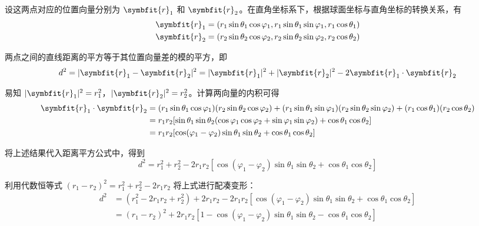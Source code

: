 \begin{myproof}
    设这两点对应的位置向量分别为 $\symbfit{r}_1$ 和 $\symbfit{r}_2$。在直角坐标系下，根据球面坐标与直角坐标的转换关系，有
    \begin{equation}
        \begin{aligned}
            \symbfit{r}_1 & = (r_1 \sin\theta_1 \cos\varphi_1, r_1 \sin\theta_1 \sin\varphi_1, r_1 \cos\theta_1) \\
            \symbfit{r}_2 & = (r_2 \sin\theta_2 \cos\varphi_2, r_2 \sin\theta_2 \sin\varphi_2, r_2 \cos\theta_2)
        \end{aligned}
    \end{equation}

    两点之间的直线距离的平方等于其位置向量差的模的平方，即
    \begin{equation}
        d^2 = |\symbfit{r}_1 - \symbfit{r}_2|^2 = |\symbfit{r}_1|^2 + |\symbfit{r}_2|^2 - 2 \symbfit{r}_1 \cdot \symbfit{r}_2
    \end{equation}

    易知 $|\symbfit{r}_1|^2 = r_1^2$，$|\symbfit{r}_2|^2 = r_2^2$。计算两向量的内积可得
    \begin{equation}
        \begin{aligned}
            \symbfit{r}_1 \cdot \symbfit{r}_2 & = (r_1 \sin\theta_1 \cos\varphi_1)(r_2 \sin\theta_2 \cos\varphi_2) + (r_1 \sin\theta_1 \sin\varphi_1)(r_2 \sin\theta_2 \sin\varphi_2) + (r_1 \cos\theta_1)(r_2 \cos\theta_2) \\
                                              & = r_1 r_2 [\sin\theta_1 \sin\theta_2 (\cos\varphi_1 \cos\varphi_2 + \sin\varphi_1 \sin\varphi_2) + \cos\theta_1 \cos\theta_2]                                                \\
                                              & = r_1 r_2 [\cos(\varphi_1 - \varphi_2) \sin\theta_1 \sin\theta_2 + \cos\theta_1 \cos\theta_2]
        \end{aligned}
    \end{equation}

    将上述结果代入距离平方公式中，得到
    \begin{equation}
        d^2 = r_1^2 + r_2^2 - 2r_1 r_2 [\cos(\varphi_1 - \varphi_2) \sin\theta_1 \sin\theta_2 + \cos\theta_1 \cos\theta_2]
    \end{equation}

    利用代数恒等式 $(r_1 - r_2)^2 = r_1^2 + r_2^2 - 2r_1 r_2$ 将上式进行配凑变形：
    \begin{equation}
        \begin{aligned}
            d^2 & = (r_1^2 - 2r_1 r_2 + r_2^2) + 2r_1 r_2 - 2r_1 r_2 [\cos(\varphi_1 - \varphi_2) \sin\theta_1 \sin\theta_2 + \cos\theta_1 \cos\theta_2] \\
                & = (r_1 - r_2)^2 + 2r_1 r_2 [1 - \cos(\varphi_1 - \varphi_2) \sin\theta_1 \sin\theta_2 - \cos\theta_1 \cos\theta_2]
        \end{aligned}
    \end{equation}


\end{myproof}
